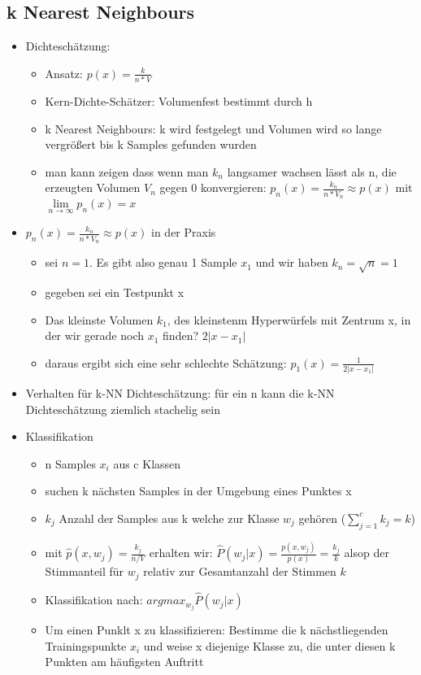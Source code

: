 \documentclass{article} %
\begin{document}
	\subsection{k Nearest Neighbours}
	\begin{itemize}
		\item Dichteschätzung:
		\begin{itemize}
			\item Ansatz: $p(x) = \frac{k}{n*V}$
			\item Kern-Dichte-Schätzer: Volumenfest bestimmt durch h
			\item k Nearest Neighbours: k wird festgelegt und Volumen wird so lange vergrößert bis k Samples gefunden wurden
			\item man kann zeigen dass wenn man $k_n$ langsamer wachsen lässt als n, die erzeugten Volumen $V_n$ gegen 0 konvergieren: $p_n(x) = \frac{k_n}{n*V_n} \approx p(x)$ mit $\lim\limits_{n\rightarrow \infty} p_n(x) = x$
		\end{itemize}
		\item $p_n(x) = \frac{k_n}{n*V_n} \approx p(x)$ in der Praxis 
		\begin{itemize}
			\item sei $n = 1$. Es gibt also genau 1 Sample $x_1$ und wir haben $k_n = \sqrt{n} = 1$
			\item gegeben sei ein Testpunkt x
			\item Das kleinste Volumen $k_1$, des kleinstenm Hyperwürfels mit Zentrum x, in der wir gerade noch $x_1$ finden? $2|x-x_1|$
			\item daraus ergibt sich eine sehr schlechte Schätzung: $p_1(x) = \frac{1}{2|x-x_1|}$
		\end{itemize}
		\item Verhalten für k-NN Dichteschätzung: für ein n kann die k-NN Dichteschätzung ziemlich stachelig sein
		\item Klassifikation
		\begin{itemize}
			\item n Samples $x_i$ aus c Klassen
			\item suchen k nächsten Samples in der Umgebung eines Punktes x
			\item $k_j$ Anzahl der Samples aus k welche zur Klasse $w_j$ gehören ($\sum_{j=1}^{c}k_j = k$)
			\item mit $\hat{p}(x,w_j) = \frac{k_j}{n/V}$ erhalten wir: $\hat{P}(w_j|x) = \frac{p(x,w_j)}{p(x)} = \frac{k_j}{k}$ alsop der Stimmanteil für $w_j$ relativ zur Gesamtanzahl der Stimmen $k$
			\item Klassifikation nach: $argmax_{w_j}\hat{P}(w_j|x)$
			\item Um einen Punklt x zu klassifizieren: Bestimme die k nächstliegenden Trainingspunkte $x_i$ und weise x diejenige Klasse zu, die unter diesen k Punkten am häufigsten Auftritt
		\end{itemize}
	\end{itemize}



\end{document}
